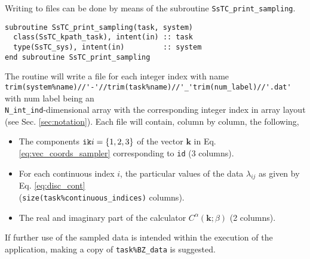 \documentclass[10pt,a4paper]{article}
\begin{document}
Writing to files can be done by means of the subroutine \verb|SsTC_print_sampling|.
\begin{lstlisting}[caption={Interface of the ``sampler" printer.},captionpos=b]
subroutine SsTC_print_sampling(task, system)
  class(SsTC_kpath_task), intent(in) :: task
  type(SsTC_sys), intent(in)         :: system
end subroutine SsTC_print_sampling
\end{lstlisting}
The routine will write a file for each integer index with name \\ \verb|trim(system%name)//'-'//trim(task%name)//'_'trim(num_label)//'.dat'| with num label being an \\ \verb|N_int_ind|-dimensional array with the corresponding integer index in array layout (see Sec. \ref{sec:notation}). Each file will contain, column by column, the following,
\begin{itemize}
\item The components $\verb|ik|i=\{1, 2, 3\}$ of the vector $\bm{k}$ in Eq. \eqref{eq:vec_coords_sampler} corresponding to \verb|id| (3 columns).
\item For each continuous index $i$, the particular values of the data $\lambda_{ij}$ as given by Eq. \eqref{eq:disc_cont} \\ (\verb|size(task%continuous_indices)| columns).
\item The real and imaginary part of the calculator $C^{\alpha}(\bm{k};\beta)$ (2 columns).
\end{itemize}
If further use of the sampled data is intended within the execution of the application, making a copy of \verb|task%BZ_data| is suggested.
\end{document}
